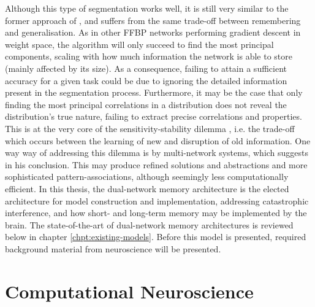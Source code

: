Although this type of segmentation works well, it is still very similar to the former approach of \cite{French1992}, and suffers from the same trade-off between remembering and generalisation. As in other FFBP networks performing gradient descent in weight space, the algorithm will only succeed to find the most principal components, scaling with how much information the network is able to store (mainly affected by its size). As a consequence, failing to attain a sufficient accuracy for a given task could be due to ignoring the detailed information present in the segmentation process. Furthermore, it may be the case that only finding the most principal correlations in a distribution does not reveal the distribution's true nature, failing to extract precise correlations and properties. This is at the very core of the sensitivity-stability dilemma \citep{Hebb1949}, i.e. the trade-off which occurs between the learning of new and disruption of old information. One way way of addressing this dilemma is by multi-network systems, which \cite{French1994} suggests in his conclusion. This may produce refined solutions and abstractions and more sophisticated pattern-associations, although seemingly less computationally efficient. In this thesis, the dual-network memory architecture \citep{McClelland1995} is the elected architecture for model construction and implementation, addressing catastrophic interference, and how short- and long-term memory may be implemented by the brain. The state-of-the-art of dual-network memory architectures is reviewed below in chapter \ref{chpt:existing-models}. Before this model is presented, required background material from neuroscience will be presented.


\section{Computational Neuroscience}

